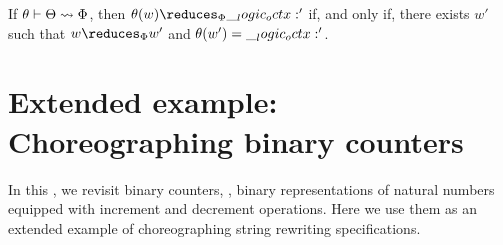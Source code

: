
\begin{corollary}\label{cor:formula-as-process:choreography-adequacy}
  If $\theta \vdash \Theta \rightsquigarrow \Phi$, then $\theta(w) \reduces_{\orsig} \octx'$ if, and only if, there exists $w'$ such that $w \reduces_{\orsig} w'$ and $\theta(w') = \__logic_octx:'$.
\end{corollary}

\section{Extended example: Choreographing binary counters}\label{sec:formula-as-process:counters}

In this , we revisit binary counters, \ie, binary representations of natural numbers equipped with increment and decrement operations.
Here we use them as an extended example of choreographing string rewriting specifications.


